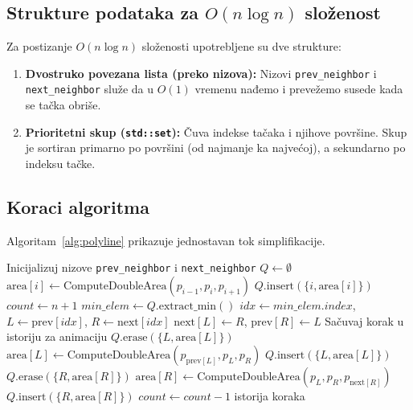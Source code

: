 \documentclass[11pt]{article}
\theoremstyle{definition}
\begin{document}
\subsection{Strukture podataka za $O(n \log n)$ složenost}

Za postizanje $O(n \log n)$ složenosti upotrebljene su dve strukture:
\begin{enumerate}[leftmargin=*]
    \item \textbf{Dvostruko povezana lista (preko nizova):} Nizovi \texttt{prev\_neighbor} i \texttt{next\_neighbor} služe da u $O(1)$ vremenu nađemo i prevežemo susede kada se tačka obriše.
    \item \textbf{Prioritetni skup (\texttt{std::set}):} Čuva indekse tačaka i njihove površine. Skup je sortiran primarno po površini (od najmanje ka najvećoj), a sekundarno po indeksu tačke.
\end{enumerate}

\subsection{Koraci algoritma}

Algoritam~\ref{alg:polyline} prikazuje jednostavan tok simplifikacije.

\begin{algorithm}[h]
\caption{Simplifikacija polilinije u $O(n \log n)$ vremenu}
\label{alg:polyline}
\begin{algorithmic}[1]
    \State Inicijalizuj nizove \texttt{prev\_neighbor} i \texttt{next\_neighbor}
    \State $Q \gets \emptyset$ 
        \State $\text{area}[i] \gets \text{ComputeDoubleArea}(p_{i-1}, p_i, p_{i+1})$
        \State $Q.\text{insert}(\{i, \text{area}[i]\})$
    \EndFor
    \State $count \gets n+1$
        \State $min\_elem \gets Q.\text{extract\_min}()$ 
        \State $idx \gets min\_elem.index$, $L \gets \text{prev}[idx]$, $R \gets \text{next}[idx]$
        \State $\text{next}[L] \gets R$, $\text{prev}[R] \gets L$ 
        \State Sačuvaj korak u istoriju za animaciju
         
            \State $Q.\text{erase}(\{L, \text{area}[L]\})$
            \State $\text{area}[L] \gets \text{ComputeDoubleArea}(p_{\text{prev}[L]}, p_L, p_R)$
            \State $Q.\text{insert}(\{L, \text{area}[L]\})$
        \EndIf
         
            \State $Q.\text{erase}(\{R, \text{area}[R]\})$
            \State $\text{area}[R] \gets \text{ComputeDoubleArea}(p_L, p_R, p_{\text{next}[R]})$
            \State $Q.\text{insert}(\{R, \text{area}[R]\})$
        \EndIf
        \State $count \gets count - 1$
    \EndWhile
    \State \Return istorija koraka
\EndFunction
\end{algorithmic}
\end{algorithm}
\end{document}

